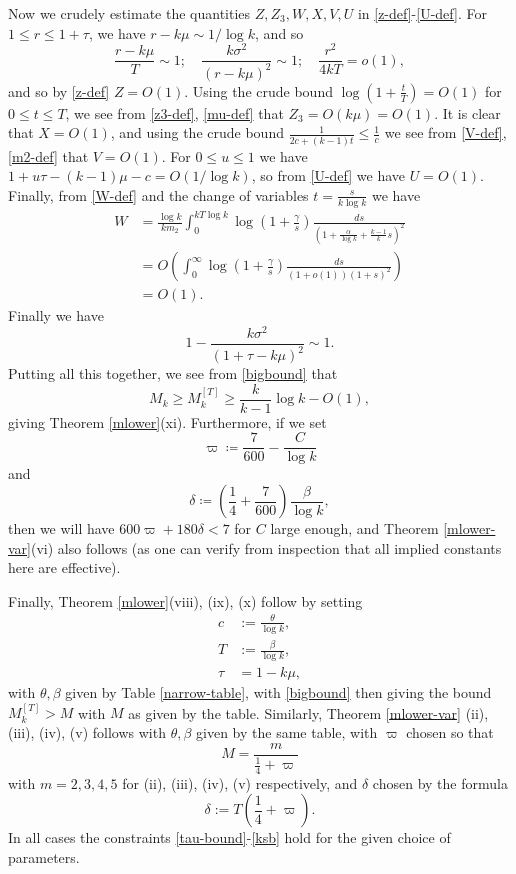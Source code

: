 Now we crudely estimate the quantities $Z,Z_3,W,X,V,U$ in \eqref{z-def}-\eqref{U-def}.  For $1 \leq r \leq 1+\tau$, we have $r-k\mu \sim 1/\log k$, and so
$$ \frac{r-k\mu}{T} \sim 1; \quad \frac{k \sigma^2}{(r-k\mu)^2} \sim 1; \quad \frac{r^2}{4kT} = o(1), $$
and so by \eqref{z-def} $Z = O(1)$.  Using the crude bound $\log(1+\frac{t}{T}) = O(1)$ for $0 \leq t \leq T$, we see from \eqref{z3-def}, \eqref{mu-def} that $Z_3 = O( k \mu ) = O(1)$.  It is clear that $X = O(1)$, and using the crude bound $\frac{1}{2c+(k-1)t} \leq \frac{1}{c}$ we see from \eqref{V-def}, \eqref{m2-def} that $V = O(1)$.  For $0 \leq u \leq 1$ we have $1 + u\tau - (k-1)\mu - c = O(1/\log k)$, so from \eqref{U-def} we have $U=O(1)$.  Finally, from \eqref{W-def} and the change of variables $t = \frac{s}{k \log k}$ we have
\begin{align*}
W &= \frac{\log k}{k m_2} \int_0^{kT\log k} \log\left(1 + \frac{\gamma}{s}\right) \frac{ds}{(1 + \frac{\alpha}{\log k} + \frac{k-1}{k} s)^2} \\
&= O\left( \int_0^\infty \log\left(1+\frac{\gamma}{s}\right) \frac{ds}{(1+o(1))(1+s)^2} \right) \\
&= O(1).
\end{align*}
Finally we have
$$ 1 - \frac{k\sigma^2}{(1+\tau-k\mu)^2} \sim 1.$$
Putting all this together, we see from \eqref{bigbound} that
$$  M_k \geq M_k^{[T]} \geq \frac{k}{k-1} \log k -  O(1), $$
giving Theorem \ref{mlower}(xi).  Furthermore, if we set
$$ \varpi \coloneqq \frac{7}{600} - \frac{C}{\log k}$$
and
$$ \delta \coloneqq \left(\frac{1}{4} + \frac{7}{600}\right) \frac{\beta}{\log k}, $$
then we will have $600 \varpi + 180 \delta < 7$ for $C$ large enough, and Theorem \ref{mlower-var}(vi) also follows (as one can verify from inspection that all implied constants here are effective).


Finally, Theorem \ref{mlower}(viii), (ix), (x) follow by setting
\begin{align*}
c &:= \frac{\theta}{\log k}, \\
T &:= \frac{\beta}{\log k}, \\
\tau &= 1 - k\mu,
\end{align*}
with $\theta,\beta$ given by Table \ref{narrow-table}, with \eqref{bigbound} then giving the bound $M_k^{[T]} > M$ with $M$ as given by the table.  Similarly, Theorem \ref{mlower-var} (ii), (iii), (iv), (v) follows with $\theta,\beta$ given by the same table, with $\varpi$ chosen so that
$$ M = \frac{m}{\frac{1}{4}+\varpi} $$
with $m=2,3,4,5$ for (ii), (iii), (iv), (v) respectively, and $\delta$ chosen by the formula
$$ \delta := T (\frac{1}{4} + \varpi).$$
In all cases the constraints \eqref{tau-bound}-\eqref{ksb} hold for the given choice of parameters.

